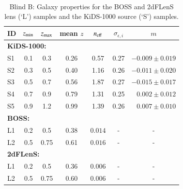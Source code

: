 \begin{appendix}
\begin{table}
\caption{Blind B: Galaxy properties for the BOSS and 2dFLenS lens (\lq L\rq) samples and the KiDS-1000 source (\lq S\rq) samples.}              %
\label{tab:datatab_BlindB}      %
\centering                                      %
\begin{tabular}{lcccccr}          %
\hline\hline                        %
ID & $z_{\rm min}$ &  $z_{\rm max}$& mean $z$ & $n_{\rm eff}$ & $\sigma_{\epsilon,i}$ & \multicolumn{1}{c}{$m$}\\    %
\hline      
\multicolumn{6}{l}{\bf KiDS-1000:}\\  
S1 & 0.1 & 0.3 & 0.26 & 0.57 &  0.27 & $-0.009\pm0.019$\\
S2 & 0.3 & 0.5 & 0.40 & 1.16 &  0.26 & $-0.011\pm0.020$\\
S3 & 0.5 & 0.7 & 0.56 & 1.87 &  0.27 & $-0.015\pm0.017$\\
S4 & 0.7 & 0.9 & 0.79 & 1.31 &  0.25 & $0.002\pm0.012$\\
S5 & 0.9 & 1.2 & 0.99 & 1.39 &  0.26 & $0.007\pm0.010$\\
\hline
\multicolumn{6}{l}{\bf BOSS:}\\                             %
L1 & 0.2 & 0.5 & 0.38 & $0.014$ & -  & \multicolumn{1}{c}{-}\\
L2 & 0.5 & 0.75 & 0.61 & $0.016$ & -  & \multicolumn{1}{c}{-}\\
\hline      
\multicolumn{6}{l}{\bf 2dFLenS:}\\                                %
L1 & 0.2 & 0.5 & 0.36 & $0.006$ & - & \multicolumn{1}{c}{-}\\
L2 & 0.5 & 0.75 & 0.60 & $0.006$ & - & \multicolumn{1}{c}{-}\\
\hline
\end{tabular}
\end{table}


\end{appendix}
